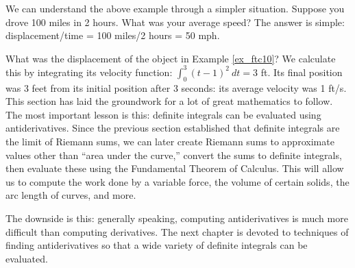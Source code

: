 We can understand the above example through a simpler situation. Suppose you drove 100 miles in 2 hours. What was your average speed? The answer is simple: displacement/time = 100 miles/2 hours = 50 mph.

What was the displacement of the object in Example \ref{ex_ftc10}? We calculate this by integrating its velocity function: $\int_0^3 (t-1)^2\ dt = 3$ ft. Its final position was 3 feet from its initial position after 3 seconds: its average velocity was 1 ft/s.\\

This section has laid the groundwork for a lot of great mathematics to follow. The most important lesson is this: definite integrals can be evaluated using antiderivatives. Since the previous section established that definite integrals are the limit of Riemann sums, we can later create Riemann sums to approximate values other than ``area under the curve,'' convert the sums to definite integrals, then evaluate these using the Fundamental Theorem of Calculus. This will allow us to compute the work done by a variable force, the volume of certain solids, the arc length of curves, and more.

The downside is this: generally speaking, computing antiderivatives is much more difficult than computing derivatives. The next chapter is devoted to techniques of finding antiderivatives so that a wide variety of definite integrals can be evaluated.

